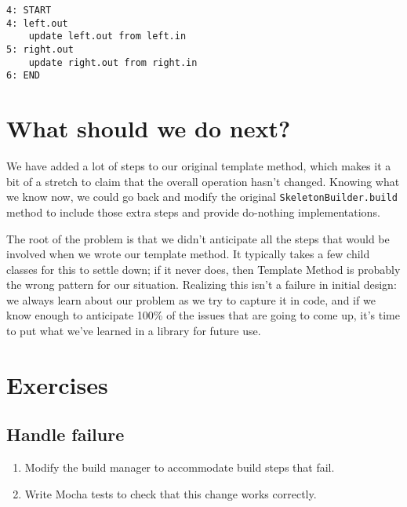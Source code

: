 \documentclass[krantzl]{krantz}
\begin{document}
\begin{lstlisting}[frame=single,frameround=tttt]
4: START
4: left.out
    update left.out from left.in
5: right.out
    update right.out from right.in
6: END
\end{lstlisting}


\section{What should we do next?}\label{build-manager-next}


We have added a lot of steps to our original template method,
which makes it a bit of a stretch to claim that the overall operation hasn't changed.
Knowing what we know now,
we could go back and modify the original \texttt{SkeletonBuilder.build} method
to include those extra steps and provide do-nothing implementations.


The root of the problem is that we didn't anticipate all the steps that would be involved
when we wrote our template method.
It typically takes a few child classes for this to settle down;
if it never does,
then Template Method is probably the wrong pattern for our situation.
Realizing this isn't a failure in initial design:
we always learn about our problem as we try to capture it in code,
and if we know enough to anticipate 100\% of the issues that are going to come up,
it's time to put what we've learned in a library for future use.


\section{Exercises}\label{build-manager-exercises}

\subsection*{Handle failure}

\begin{enumerate}

\item 

Modify the build manager to accommodate build steps that fail.



\item 

Write Mocha tests to check that this change works correctly.



\end{enumerate}
\end{document}

